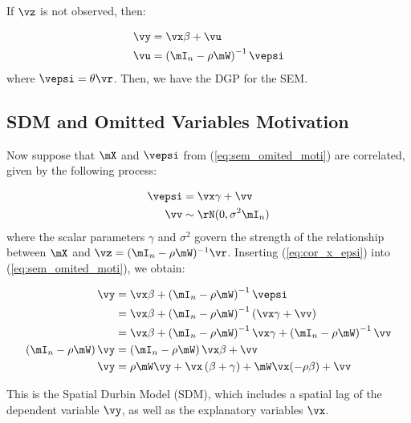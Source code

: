 \documentclass[english,12pt]{book}\usepackage[]{graphicx}\usepackage[]{xcolor}
\begin{document}
If $\vz$ is not observed, then:


\begin{equation}\label{eq:sem_omited_moti}
  \begin{aligned}
    \vy & = \vx\beta + \vu \\
    \vu & = \left(\mI_n - \rho\mW\right)^{-1}\vepsi
  \end{aligned}
\end{equation}
%
where $\vepsi = \theta\vr$. Then, we have the DGP for the SEM.

\subsection{SDM and Omitted Variables Motivation}

Now suppose that $\mX$ and $\vepsi$ from (\ref{eq:sem_omited_moti}) are correlated, given by the following process:

\begin{equation}\label{eq:cor_x_epsi}
\begin{aligned}
  \vepsi & = \vx \gamma + \vv \\
  \vv    & \sim \rN(0, \sigma^2\mI_n) 
\end{aligned}
\end{equation}
%
where the scalar parameters $\gamma$ and $\sigma^2$ govern the strength of the relationship between $\mX$ and $\vz = (\mI_n-\rho\mW)^{-1}\vr$. Inserting (\ref{eq:cor_x_epsi}) into (\ref{eq:sem_omited_moti}), we obtain:

\begin{equation}
  \begin{aligned}
    \vy & = \vx\beta + \left(\mI_n - \rho\mW\right)^{-1}\vepsi \\
        & = \vx\beta + \left(\mI_n - \rho\mW\right)^{-1}\left(\vx \gamma + \vv\right) \\
        & = \vx\beta + \left(\mI_n - \rho\mW\right)^{-1}\vx \gamma + \left(\mI_n - \rho\mW\right)^{-1}\vv \\
       \left(\mI_n - \rho\mW\right)\vy & = \left(\mI_n - \rho\mW\right)\vx\beta  + \vv \\
       \vy & = \rho\mW\vy + \vx\left(\beta + \gamma\right) + \mW\vx(-\rho\beta) + \vv
  \end{aligned}
\end{equation}

This is the Spatial Durbin Model (SDM), which includes a spatial lag of the dependent variable $\vy$, as well as the explanatory variables $\vx$.
\end{document}
